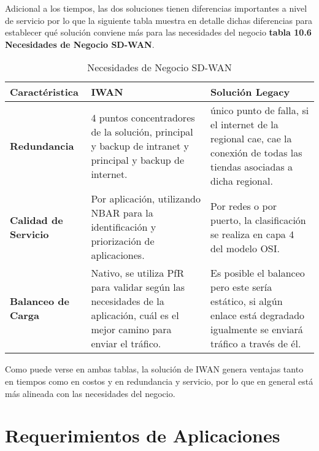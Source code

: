 Adicional a los tiempos, las dos soluciones tienen diferencias importantes a nivel de servicio por lo que la siguiente tabla muestra en detalle dichas diferencias para establecer qué solución conviene más para las necesidades del negocio \textbf{tabla 10.6 Necesidades de Negocio SD-WAN}.

\begin{table}[ht]
\caption{Necesidades de Negocio SD-WAN}
\label{tabla:autores}
\centering
\begin{tabular}{p{3.5cm} p{5.5cm} p{5.5cm} }
\hline
\textbf{Caractéristica} & \textbf{IWAN} & \textbf{Solución Legacy} \\
\hline
\textbf{Redundancia} & 4 puntos concentradores de la solución, principal y backup de intranet y principal y backup de internet.  & único punto de falla, si el internet de la regional cae, cae la conexión de todas las tiendas asociadas a dicha regional.\\
\hline
\textbf{Calidad de Servicio} & Por aplicación, utilizando NBAR para la identificación y priorización de aplicaciones. & Por redes o por puerto, la clasificación se realiza en capa 4 del modelo OSI. \\
\hline
\textbf{Balanceo de Carga} & Nativo, se utiliza PfR para validar según las necesidades de la aplicación, cuál es el mejor camino para enviar el tráfico. & Es posible el balanceo pero este sería estático, si algún enlace está degradado igualmente se enviará tráfico a través de él. \\
\hline
\end{tabular}
\end{table}

Como puede verse en ambas tablas, la solución de IWAN genera ventajas tanto en tiempos como en costos y en redundancia y servicio, por lo que en general está más alineada con las necesidades del negocio.

\section{Requerimientos de Aplicaciones} %
\label{sec:Requerimientos de Aplicaciones}

